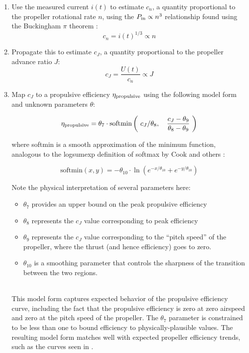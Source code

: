 \begin{enumerate}
    \item Use the measured current $i(t)$ to estimate $c_n$, a quantity proportional to the propeller rotational rate $n$, using the $P_{\rm in}\propto n^3$ relationship found using the Buckingham $\pi$ theorem \cite{unified_propellers}:
    \begin{equation*}
        c_n = i(t)^{1/3} \propto n
    \end{equation*}
    \item Propagate this to estimate $c_J$, a quantity proportional to the propeller advance ratio $J$:
    \begin{equation*}
        c_J = \frac{U(t)}{c_n} \propto J
    \end{equation*}
    \item Map $c_J$ to a propulsive efficiency $\eta_{\rm propulsive}$ using the following model form and unknown parameters $\theta$:

    \begin{equation}
        \eta_{\rm propulsive} =
        \theta_7 \cdot \text{softmin} \left(\
        c_J / \theta_8,\quad
        \frac{c_J - \theta_9}{\theta_8 - \theta_9}\
        \right)
    \end{equation}

    \noindent where softmin is a smooth approximation of the minimum function, analogous to the logsumexp definition of softmax by Cook and others \cite{cook_basic_2011}:

    \begin{equation*}
        \text{softmin}(x, y) = -\theta_{10} \cdot \ln \left( e^{-x / \theta_{10}} + e^{-y / \theta_{10}} \right)
    \end{equation*}

    \noindent Note the physical interpretation of several parameters here:
    \begin{itemize}
        \item $\theta_7$ provides an upper bound on the peak propulsive efficiency
        \item $\theta_8$ represents the $c_J$ value corresponding to peak efficiency
        \item $\theta_9$ represents the $c_J$ value corresponding to the ``pitch speed'' of the propeller, where the thrust (and hence efficiency) goes to zero.
        \item $\theta_{10}$ is a smoothing parameter that controls the sharpness of the transition between the two regions.
    \end{itemize}\ \\
    \noindent This model form captures expected behavior of the propulsive efficiency curve, including the fact that the propulsive efficiency is zero at zero airspeed and zero at the pitch speed of the propeller. The $\theta_7$ parameter is constrained to be less than one to bound efficiency to physically-plausible values. The resulting model form matches well with expected propeller efficiency trends, such as the curves seen in \cite{unified_propellers}.
\end{enumerate}

